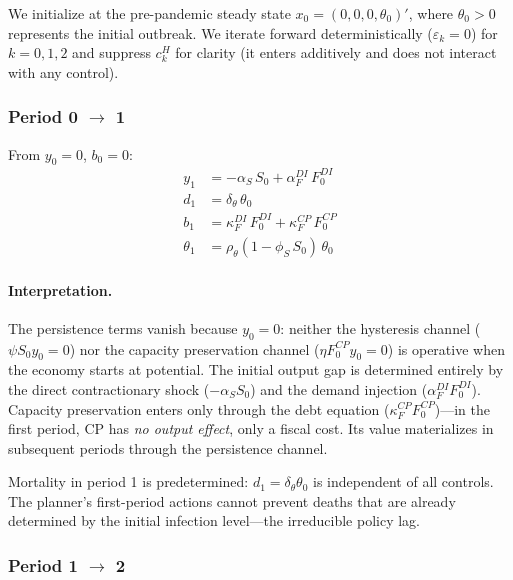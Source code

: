 \documentclass[12pt, a4paper]{article}
\begin{document}
We initialize at the pre-pandemic steady state $x_0 = (0, 0, 0, \theta_0)'$, where $\theta_0 > 0$ represents the initial outbreak. We iterate forward deterministically ($\varepsilon_k = 0$) for $k = 0, 1, 2$ and suppress $c_k^H$ for clarity (it enters additively and does not interact with any control).

\subsubsection*{Period 0 $\to$ 1}

From $y_0 = 0$, $b_0 = 0$:
%
\begin{align}
    y_1 &= -\alpha_S \, S_0 + \alpha_F^{DI} \, F_0^{DI}
    \label{eq:y1} \\[4pt]
    d_1 &= \delta_\theta \, \theta_0
    \label{eq:d1} \\[4pt]
    b_1 &= \kappa_F^{DI} \, F_0^{DI} + \kappa_F^{CP} \, F_0^{CP}
    \label{eq:b1} \\[4pt]
    \theta_1 &= \rho_\theta (1 - \phi_S \, S_0) \, \theta_0
    \label{eq:theta1}
\end{align}

\paragraph{Interpretation.} The persistence terms vanish because $y_0 = 0$: neither the hysteresis channel ($\psi S_0 y_0 = 0$) nor the capacity preservation channel ($\eta F_0^{CP} y_0 = 0$) is operative when the economy starts at potential. The initial output gap is determined entirely by the direct contractionary shock ($-\alpha_S S_0$) and the demand injection ($\alpha_F^{DI} F_0^{DI}$). Capacity preservation enters only through the debt equation ($\kappa_F^{CP} F_0^{CP}$)---in the first period, CP has \textit{no output effect}, only a fiscal cost. Its value materializes in subsequent periods through the persistence channel.

Mortality in period 1 is predetermined: $d_1 = \delta_\theta \theta_0$ is independent of all controls. The planner's first-period actions cannot prevent deaths that are already determined by the initial infection level---the irreducible policy lag.

\subsubsection*{Period 1 $\to$ 2}
\end{document}

